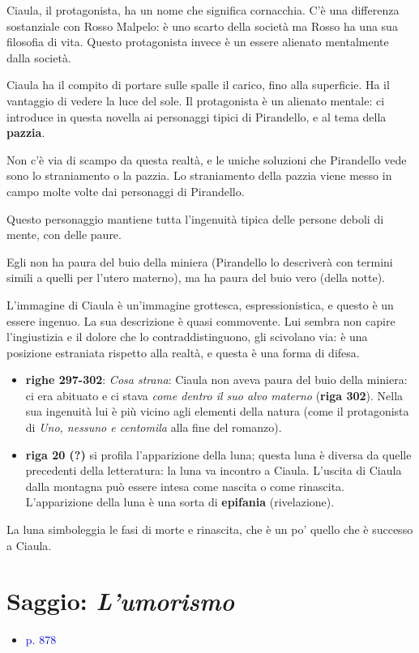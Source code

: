 \documentclass[a4paper, twoside, titlepage]{book}
\newcommand{\elenco}[1]{%
\begin{itemize}
#1
\end{itemize}}
\renewcommand{\emph}[1]{\textcolor{blue}{#1}}
\begin{document}
Ciaula, il protagonista, ha un nome che significa cornacchia. C'è una differenza sostanziale con Rosso Malpelo: è uno scarto della società ma Rosso ha una sua filosofia di vita. Questo protagonista invece è un essere alienato mentalmente dalla società.

Ciaula ha il compito di portare sulle spalle il carico, fino alla superficie. Ha il vantaggio di vedere la luce del sole.
Il protagonista è un alienato mentale: ci introduce in questa novella ai personaggi tipici di Pirandello, e al tema della \textbf{pazzia}.

Non c'è via di scampo da questa realtà, e le uniche soluzioni che Pirandello vede sono lo straniamento o la pazzia. Lo straniamento della pazzia viene messo in campo molte volte dai personaggi di Pirandello.

Questo personaggio mantiene tutta l'ingenuità tipica delle persone deboli di mente, con delle paure.

Egli non ha paura del buio della miniera (Pirandello lo descriverà con termini simili a quelli per l'utero materno), ma ha paura del buio vero (della notte).

L'immagine di Ciaula è un'immagine grottesca, espressionistica, e questo è un essere ingenuo.
La sua descrizione è quasi commovente. Lui sembra non capire l'ingiustizia e il dolore che lo contraddistinguono, gli scivolano via: è una posizione estraniata rispetto alla realtà, e questa è una forma di difesa.

\elenco{\item \textbf{righe 297-302}: \textit{Cosa strana}: Ciaula non aveva paura del buio della miniera: ci era abituato e ci stava \textit{come dentro il suo alvo materno} (\textbf{riga 302}). Nella sua ingenuità lui è più vicino agli elementi della natura (come il protagonista di \textit{Uno, nessuno e centomila} alla fine del romanzo).
\item \textbf{riga 20 (?)} si profila l'apparizione della luna; questa luna è diversa da quelle precedenti della letteratura: la luna va incontro a Ciaula. L'uscita di Ciaula dalla montagna può essere intesa come nascita o come rinascita. L'apparizione della luna è una sorta di \textbf{epifania} (rivelazione).
}

La luna simboleggia le fasi di morte e rinascita, che è un po' quello che è successo a Ciaula.

\chapter{Saggio: \textit{L'umorismo}}
\elenco{\item \emph{p. 878}}
\end{document}
